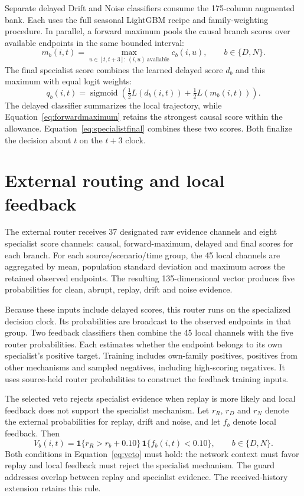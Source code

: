 Separate delayed Drift and Noise classifiers consume the 175-column augmented bank. Each uses the full seasonal LightGBM recipe and family-weighting procedure. In parallel, a forward maximum pools the causal branch scores over available endpoints in the same bounded interval:
\begin{equation}
 m_b(i,t)=\max_{u\in[t,t+3]:\,(i,u)\ \mathrm{available}}c_b(i,u),
 \qquad b\in\{D,N\}.\label{eq:forwardmaximum}
\end{equation}
The final specialist score combines the learned delayed score $d_b$ and this maximum with equal logit weights:
\begin{equation}
 q_b(i,t)=\operatorname{sigmoid}\left(\tfrac12L(d_b(i,t))+\tfrac12L(m_b(i,t))\right).
 \label{eq:specialistfinal}
\end{equation}
The delayed classifier summarizes the local trajectory, while Equation~\eqref{eq:forwardmaximum} retains the strongest causal score within the allowance. Equation~\eqref{eq:specialistfinal} combines these two scores. Both finalize the decision about $t$ on the $t+3$ clock.

\section{External routing and local feedback}
The external router receives 37 designated raw evidence channels and eight specialist score channels: causal, forward-maximum, delayed and final scores for each branch. For each source/scenario/time group, the 45 local channels are aggregated by mean, population standard deviation and maximum across the retained observed endpoints. The resulting 135-dimensional vector produces five probabilities for clean, abrupt, replay, drift and noise evidence.

Because these inputs include delayed scores, this router runs on the specialized decision clock. Its probabilities are broadcast to the observed endpoints in that group. Two feedback classifiers then combine the 45 local channels with the five router probabilities. Each estimates whether the endpoint belongs to its own specialist's positive target. Training includes own-family positives, positives from other mechanisms and sampled negatives, including high-scoring negatives. It uses source-held router probabilities to construct the feedback training inputs.

The selected veto rejects specialist evidence when replay is more likely and local feedback does not support the specialist mechanism. Let $r_R$, $r_D$ and $r_N$ denote the external probabilities for replay, drift and noise, and let $f_b$ denote local feedback. Then
\begin{equation}
 V_b(i,t)=\mathbf1\{r_R>r_b+0.10\}\,
          \mathbf1\{f_b(i,t)<0.10\},\qquad b\in\{D,N\}.
 \label{eq:veto}
\end{equation}
Both conditions in Equation~\eqref{eq:veto} must hold: the network context must favor replay and local feedback must reject the specialist mechanism. The guard addresses overlap between replay and specialist evidence. The received-history extension retains this rule.

